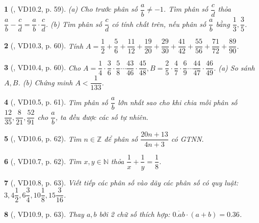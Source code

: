 \documentclass{article}
\newtheorem{baitoan}{}
\begin{document}
\begin{baitoan}[\cite{TLCT_THCS_Toan_6_so_hoc}, VD10.2, p. 59]
	(a) Cho trước phân số $\dfrac{a}{b}\ne-1$. Tìm phân số $\dfrac{c}{d}$ thỏa $\dfrac{a}{b} - \dfrac{c}{d} = \dfrac{a}{b}\cdot\dfrac{c}{d}$. (b) Tìm phân số $\dfrac{c}{d}$ có tính chất trên, nếu phân số $\dfrac{a}{b}$ bằng $\dfrac{1}{3},\dfrac{3}{5}$.
\end{baitoan}

\begin{baitoan}[\cite{TLCT_THCS_Toan_6_so_hoc}, VD10.3, p. 60]
	Tính $A = \dfrac{1}{2} + \dfrac{5}{6} + \dfrac{11}{12} + \dfrac{19}{20} + \dfrac{29}{30} + \dfrac{41}{42} + \dfrac{55}{56} + \dfrac{71}{72} + \dfrac{89}{90}$.
\end{baitoan}

\begin{baitoan}[\cite{TLCT_THCS_Toan_6_so_hoc}, VD10.4, p. 60]
	Cho $A = \dfrac{1}{4}\cdot\dfrac{3}{6}\cdot\dfrac{5}{8}\cdots\dfrac{43}{46}\cdot\dfrac{45}{48},B = \dfrac{2}{5}\cdot\dfrac{4}{7}\cdot\dfrac{6}{9}\cdots\dfrac{44}{47}\cdot\dfrac{46}{49}$. (a) So sánh $A,B$. (b) Chứng minh $A < \dfrac{1}{133}$.
\end{baitoan}

\begin{baitoan}[\cite{TLCT_THCS_Toan_6_so_hoc}, VD10.5, p. 61]
	Tìm phân số $\dfrac{a}{b}$ lớn nhất sao cho khi chia mỗi phân số $\dfrac{12}{35},\dfrac{8}{21},\dfrac{52}{91}$ cho $\dfrac{a}{b}$, ta đều được các số tự nhiên.
\end{baitoan}

\begin{baitoan}[\cite{TLCT_THCS_Toan_6_so_hoc}, VD10.6, p. 62]
	Tìm $n\in\mathbb{Z}$ để phân số $\dfrac{20n + 13}{4n + 3}$ có {\rm GTNN}.
\end{baitoan}

\begin{baitoan}[\cite{TLCT_THCS_Toan_6_so_hoc}, VD10.7, p. 62]
	Tìm $x,y\in\mathbb{N}$ thỏa $\dfrac{1}{x} + \dfrac{1}{y} = \dfrac{1}{8}$.
\end{baitoan}

\begin{baitoan}[\cite{TLCT_THCS_Toan_6_so_hoc}, VD10.8, p. 63]
	Viết tiếp các phân số vào dãy các phân số có quy luật: $3,4\dfrac{1}{2},6\dfrac{3}{4},10\dfrac{1}{8},15\dfrac{3}{16}$.
\end{baitoan}

\begin{baitoan}[\cite{TLCT_THCS_Toan_6_so_hoc}, VD10.9, p. 63]
	Thay $a,b$ bởi 2 chữ số thích hợp: $\overline{0.ab}\cdot(a + b) = 0.36$.
\end{baitoan}
\end{document}
